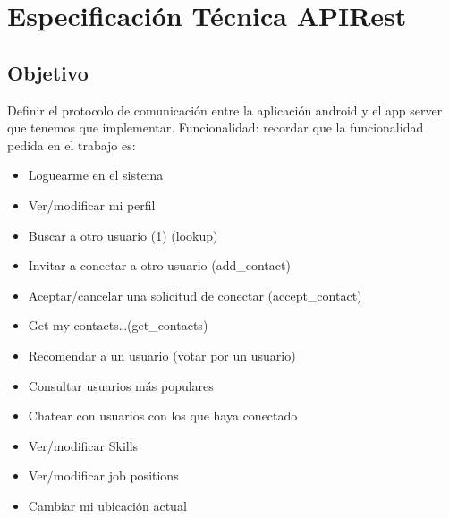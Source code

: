 \documentclass[a4paper,10pt,spanish]{sphinxmanual}
\begin{document}
\section{Especificación Técnica APIRest}
\label{appServer:especificacion-tecnica-apirest}

\subsection{Objetivo}
\label{apiRest:objetivo}\label{apiRest::doc}
Definir el protocolo de comunicación entre la aplicación android y el app server que tenemos que implementar.
Funcionalidad: recordar que la funcionalidad pedida en el trabajo es:
\begin{itemize}
\item {} 
Loguearme en el sistema

\item {} 
Ver/modificar mi perfil

\item {} 
Buscar a otro usuario  (1) (lookup)

\item {} 
Invitar a conectar a otro usuario (add\_contact)

\item {} 
Aceptar/cancelar una solicitud de conectar (accept\_contact)

\item {} 
Get my contacts…(get\_contacts)

\item {} 
Recomendar a un usuario (votar por un usuario)

\item {} 
Consultar usuarios más populares

\item {} 
Chatear con usuarios con los que haya conectado

\item {} 
Ver/modificar Skills

\item {} 
Ver/modificar job positions

\item {} 
Cambiar mi ubicación actual

\end{itemize}
\end{document}
